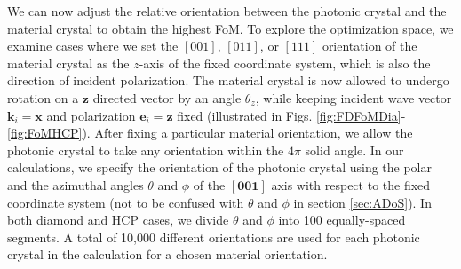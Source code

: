 \documentclass[%
 reprint,
superscriptaddress,
 amsmath,amssymb,
 aps,
pra,
]{revtex4-1}
\newcommand{\mb}[1]{\mathbf{#1}} %
\begin{document}
We can now adjust the relative orientation between the photonic crystal and the material crystal to obtain the highest FoM.
To explore the optimization space, we examine cases where we set the $[001]$, $[011]$, or $[111]$ orientation of the material crystal as the $z$-axis of the fixed coordinate system, which is also the direction of incident polarization. The material crystal is now allowed to  undergo rotation on a $\mb{z}$ directed vector by an angle $\theta_z$, while keeping incident wave vector $\mb{k}_i=\mb{x}$ and polarization $\mb{e}_i=\mb{z}$ fixed (illustrated in Figs. \ref{fig:FDFoMDia}-\ref{fig:FoMHCP}). After fixing a particular material orientation, we allow the photonic crystal to take any orientation within the $4\pi$ solid angle. In our calculations, we specify the orientation of the photonic crystal using the polar and the azimuthal angles $\theta$ and $\phi$ of the $[\textbf{001}]$ axis with respect to the fixed coordinate system (not to be confused with $\theta$ and $\phi$ in section \ref{sec:ADoS}). In both diamond and HCP cases, we divide $\theta$ and $\phi$ into 100 equally-spaced segments. A total of 10,000 different orientations are used for each photonic crystal in the calculation for a chosen material orientation.
\end{document}
